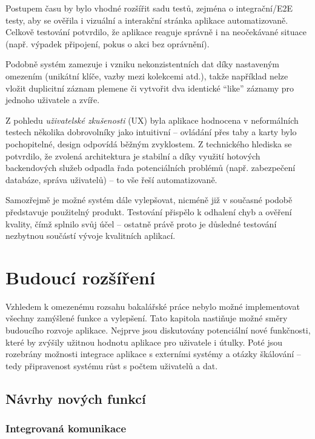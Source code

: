 \documentclass[czech, bp, kiv, he, iso690numb, pdf]{fasthesis}
\begin{document}
    Postupem času by bylo vhodné rozšířit sadu testů, zejména o integrační/E2E testy, aby se ověřila i vizuální a interakční stránka aplikace automatizovaně. Celkově testování potvrdilo, že aplikace reaguje správně i na neočekávané situace (např. výpadek připojení, pokus o akci bez oprávnění).

    Podobně systém zamezuje i vzniku nekonzistentních dat díky nastaveným omezením (unikátní klíče, vazby mezi kolekcemi atd.), takže například nelze vložit duplicitní záznam plemene či vytvořit dva identické ``like'' záznamy pro jednoho uživatele a zvíře.

    Z pohledu \textit{uživatelské zkušenosti} (UX) byla aplikace hodnocena v neformálních testech několika dobrovolníky jako intuitivní -- ovládání přes taby a karty bylo pochopitelné, design odpovídá běžným zvyklostem. Z technického hlediska se potvrdilo, že zvolená architektura je stabilní a díky využití hotových backendových služeb odpadla řada potenciálních problémů (např. zabezpečení databáze, správa uživatelů) -- to vše řeší  automatizovaně.

    Samozřejmě je možné systém dále vylepšovat, nicméně již v současné podobě představuje použitelný produkt. Testování přispělo k odhalení chyb a ověření kvality, čímž splnilo svůj účel -- ostatně právě proto je důsledné testování nezbytnou součástí vývoje kvalitních aplikací.




    \chapter{Budoucí rozšíření}

    Vzhledem k omezenému rozsahu bakalářské práce nebylo možné implementovat všechny zamýšlené funkce a vylepšení. Tato kapitola nastiňuje možné směry budoucího rozvoje aplikace. Nejprve jsou diskutovány potenciální nové funkčnosti, které by zvýšily užitnou hodnotu aplikace pro uživatele i útulky. Poté jsou rozebrány možnosti integrace aplikace s externími systémy a otázky škálování – tedy připravenost systému růst s počtem uživatelů a dat.

    \section{Návrhy nových funkcí}

    \subsection*{Integrovaná komunikace}
\end{document}
